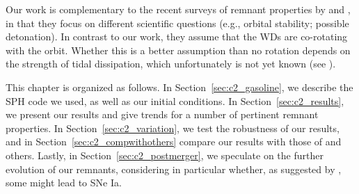 Our work is complementary to the recent surveys of remnant properties by \cite{rask+12} and \cite{dan+12}, in that they focus on different scientific questions (e.g., orbital stability; possible detonation).  In contrast to our work, they assume that the WDs are co-rotating with the orbit.  Whether this is a better assumption than no rotation depends on the strength of tidal dissipation, which unfortunately is not yet known (see \citealt{marsns04,fulll12}).

This chapter is organized as follows.  In Section~\ref{sec:c2_gasoline}, we describe the SPH code we used, as well as our initial conditions.  In Section~\ref{sec:c2_results}, we present our results and give trends for a number of pertinent remnant properties.  In Section~\ref{sec:c2_variation}, we test the robustness of our results, and in Section~\ref{sec:c2_compwithothers} compare our results with those of \citeal{loreig09} and others.  Lastly, in Section~\ref{sec:c2_postmerger}, we speculate on the further evolution of our remnants, considering in particular whether, as suggested by \citeal{vkercj10}, some might lead to SNe Ia.
